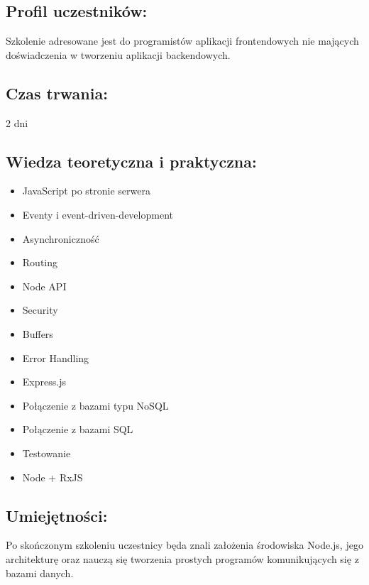 \documentclass{article}[10pt]
\begin{document}
	\subsection*{Profil uczestników:}
\begin{adjustwidth}{2cm}{}
\justifying
	
Szkolenie adresowane jest do programistów aplikacji frontendowych nie mających doświadczenia w tworzeniu aplikacji backendowych.
\end{adjustwidth}
	\subsection*{Czas trwania:}
\begin{adjustwidth}{2cm}{}
	2 dni
\end{adjustwidth}

	\subsection*{Wiedza teoretyczna i praktyczna:}
\begin{adjustwidth}{1.5cm}{}
	\begin{itemize}
		\item JavaScript po stronie serwera
		\item Eventy i event-driven-development
		\item Asynchroniczność
		\item Routing
		\item Node API
		\item Security
		\item Buffers
		\item Error Handling
		\item Express.js
		\item Połączenie z bazami typu NoSQL
		\item Połączenie z bazami SQL
		\item Testowanie
		\item Node + RxJS
	\end{itemize}
\end{adjustwidth}

	\subsection*{Umiejętności:}
\begin{adjustwidth}{2cm}{}
\justifying
	
Po skończonym szkoleniu uczestnicy będa znali założenia środowiska Node.js, jego architekturę oraz nauczą się tworzenia prostych programów komunikujących się z bazami danych.

\end{adjustwidth}
\end{document}
